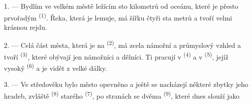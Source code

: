 %
%
%

\VUsaut{2.0mm}
\VUsaut{3.0mm}
\VUfilet{16mm}
\VUsaut{5.6mm}
\VUsaut{1.4mm}
\VUsaut{2.2mm}

\VUsaut{3.0mm}

1. --- Bydlím ve velkém městě ležícím sto kilometrů od oceánu, které je přesto prvořadým
 \textsuperscript{(1)}. Řeka, která je lemuje, má šířku čtyři sta metrů a
tvoří velmi krásnou rejdu.

2. --- Celá část města, která je na  \textsuperscript{(2)}, má zcela námořní
a průmyslový vzhled a tvoří  \textsuperscript{(3)}, které obývají jen
námořníci a dělníci. Ti pracují v  \textsuperscript{(4)} a v
 \textsuperscript{(5)}, jejíž vysoký
 \textsuperscript{(6)} a  je vidět z velké dálky.

3. --- Ve středověku bylo město opevněno a ještě se nacházejí některé zbytky jeho hradeb,
zvláště  \textsuperscript{(8)} starého 
\textsuperscript{(7)}, po stranách se dvěma  \textsuperscript{(9)}, které dnes
slouží jako 

